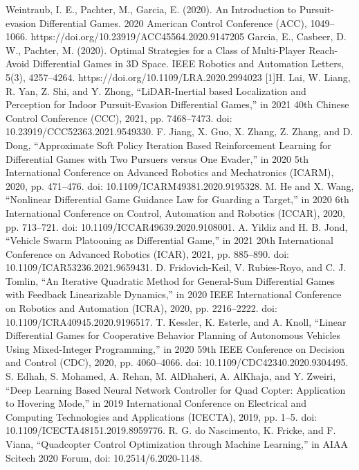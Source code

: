 \documentclass[conference]{IEEEtran}
\begin{document}
\begin{thebibliography}{00}
 Weintraub, I. E., Pachter, M., Garcia, E. (2020). An Introduction to Pursuit-evasion Differential Games. 2020 American Control Conference (ACC), 1049–1066. https://doi.org/10.23919/ACC45564.2020.9147205
 Garcia, E., Casbeer, D. W., Pachter, M. (2020). Optimal Strategies for a Class of Multi-Player Reach-Avoid Differential Games in 3D Space. IEEE Robotics and Automation Letters, 5(3), 4257–4264. https://doi.org/10.1109/LRA.2020.2994023
 [1]H. Lai, W. Liang, R. Yan, Z. Shi, and Y. Zhong, “LiDAR-Inertial based Localization and Perception for Indoor Pursuit-Evasion Differential Games,” in 2021 40th Chinese Control Conference (CCC), 2021, pp. 7468–7473. doi: 10.23919/CCC52363.2021.9549330.
 F. Jiang, X. Guo, X. Zhang, Z. Zhang, and D. Dong, “Approximate Soft Policy Iteration Based Reinforcement Learning for Differential Games with Two Pursuers versus One Evader,” in 2020 5th International Conference on Advanced Robotics and Mechatronics (ICARM), 2020, pp. 471–476. doi: 10.1109/ICARM49381.2020.9195328.
 M. He and X. Wang, “Nonlinear Differential Game Guidance Law for Guarding a Target,” in 2020 6th International Conference on Control, Automation and Robotics (ICCAR), 2020, pp. 713–721. doi: 10.1109/ICCAR49639.2020.9108001.
 A. Yildiz and H. B. Jond, “Vehicle Swarm Platooning as Differential Game,” in 2021 20th International Conference on Advanced Robotics (ICAR), 2021, pp. 885–890. doi: 10.1109/ICAR53236.2021.9659431.
 D. Fridovich-Keil, V. Rubies-Royo, and C. J. Tomlin, “An Iterative Quadratic Method for General-Sum Differential Games with Feedback Linearizable Dynamics,” in 2020 IEEE International Conference on Robotics and Automation (ICRA), 2020, pp. 2216–2222. doi: 10.1109/ICRA40945.2020.9196517.
 T. Kessler, K. Esterle, and A. Knoll, “Linear Differential Games for Cooperative Behavior Planning of Autonomous Vehicles Using Mixed-Integer Programming,” in 2020 59th IEEE Conference on Decision and Control (CDC), 2020, pp. 4060–4066. doi: 10.1109/CDC42340.2020.9304495.
 S. Edhah, S. Mohamed, A. Rehan, M. AlDhaheri, A. AlKhaja, and Y. Zweiri, “Deep Learning Based Neural Network Controller for Quad Copter: Application to Hovering Mode,” in 2019 International Conference on Electrical and Computing Technologies and Applications (ICECTA), 2019, pp. 1–5. doi: 10.1109/ICECTA48151.2019.8959776.
 R. G. do Nascimento, K. Fricke, and F. Viana, “Quadcopter Control Optimization through Machine Learning,” in AIAA Scitech 2020 Forum, doi: 10.2514/6.2020-1148.

\end{thebibliography}
\end{document}
